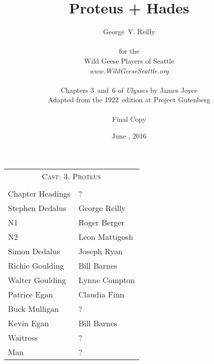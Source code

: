 



\title{\Huge Proteus + Hades}
\author{George~V. Reilly\\
\\
{\small for the}\\
Wild Geese Players of Seattle\\
{\emph{www.WildGeeseSeattle.org}}\\
\\
{\small Chapters 3~and~6 of \emph{Ulysses} by James Joyce}\\
{\small Adapted from the 1922~edition at Project Gutenberg}
\\
\\
{\small Final Copy}}
\date{June , 2016}
\raggedbottom



\maketitle
\thispagestyle{empty}
\pagebreak

\begin{tabular}{lp{10cm}}
    \multicolumn{2}{c}{\Large \textsc{Cast: 3. Proteus}} \\
\\
Chapter Headings & ? \\
Stephen Dedalus & George Reilly \\
N1  & Roger Berger \\
N2  & Leon Mattigosh \\
Simon Dedalus  & Joseph Ryan \\
Richie Goulding  & Bill Barnes \\
Walter Goulding  & Lynne Compton \\
Patrice Egan  & Claudia Finn \\
Buck Mulligan  & ?\\
Kevin Egan  & Bill Barnes \\
Waitress  & ?\\
Man  & ?\\
\end{tabular}

\bigskip
\bigskip

